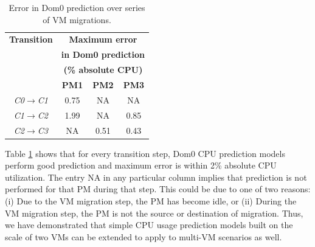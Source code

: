 \begin{table}[h]
	\centering
	\caption{Error in Dom0 prediction over series of VM migrations.}
	\begin{tabular}{ |c|c|c|c|} \hline
		\textbf{Transition} & \multicolumn{3}{|c|}{\textbf{Maximum error}} \\
		 & \multicolumn{3}{|c|}{\textbf{in Dom0 prediction}} \\
		 & \multicolumn{3}{|c|}{\textbf{(\% absolute CPU)}} \\ \cline{2-4}
		 & \textbf{PM1} & \textbf{PM2}  & \textbf{PM3} \\ \hline  %
		\textit{C0}$\rightarrow$\textit{C1} & 0.75 & NA & NA \\
		\textit{C1}$\rightarrow$\textit{C2} & 1.99 & NA & 0.85 \\
		\textit{C2}$\rightarrow$\textit{C3} & NA & 0.51 & 0.43  \\ \hline
	\end{tabular}
	\label{tab:vm-steps-error}
\end{table}



Table \ref{tab:vm-steps-error} shows that for every transition step,
Dom0 CPU prediction models perform good prediction and maximum
error is within 2\% absolute CPU utilization. The entry NA in any
particular column implies that prediction is not performed for that
PM during that step. This could be due to one of two reasons: (i) Due to
the VM migration step, the PM has become idle, or (ii) During the
VM migration step, the PM is not the source or destination of
migration.
Thus, we have demonstrated that simple CPU usage prediction models built
on the scale of two VMs can be extended to apply to multi-VM
scenarios as well.






